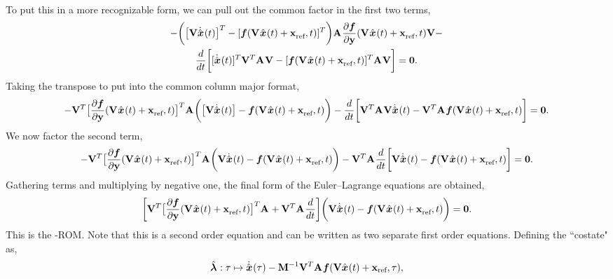 \documentclass[3p,computermodern,10pt]{elsarticle}
\begin{document}
\begin{appendices}
\begin{multline*}
\end{multline*}
To put this in a more recognizable form, we can pull out the common factor in the first two terms,
\begin{multline*}
- \bigg( \big[ \mathbf {V} \dot{\hat{ \boldsymbol x}}^{}(t) \big]^T  -  [\boldsymbol f(\mathbf {V}^{} \hat{ \boldsymbol x}^{}(t) + \mathbf{x}_\text{ref}^{},t)] ^T \bigg) \mathbf{A}^{}
 \frac{\partial \boldsymbol f}{\partial \mathbf{y}}(\mathbf {V}^{} \hat{ \boldsymbol x}^{}(t) + \mathbf{x}_\text{ref}^{},t) \mathbf {V} -  \\
\frac{d}{dt} \bigg[  [\dot{\hat{ \boldsymbol x}}^{}(t)]^T \mathbf {V}^T \mathbf{A}^{} \mathbf {V} -  
[\boldsymbol f(\mathbf {V}^{} \hat{ \boldsymbol x}^{}(t) + \mathbf{x}_\text{ref}^{},t) ]^T \mathbf{A}^{} \mathbf {V}  \bigg] = \boldsymbol 0.
\end{multline*}
Taking the transpose to put into the common column major format,
$$ -  \mathbf {V}^T \big[ \frac{\partial \boldsymbol f}{\partial \mathbf{y}}(\mathbf {V}^{} \hat{ \boldsymbol x}^{}(t) + \mathbf{x}_\text{ref}^{},t)  \big]^T \mathbf{A}^{} \bigg( \big[ \mathbf {V} \dot{\hat{ \boldsymbol x}}^{}(t)\big]  -  \boldsymbol f(\mathbf {V}^{} \hat{ \boldsymbol x}^{}(t) + \mathbf{x}_\text{ref}^{},t)  \bigg) -  \frac{d}{dt} \bigg[  \mathbf {V}^T \mathbf{A}^{} \mathbf {V} \dot{\hat{ \boldsymbol x}}^{}(t)  - \mathbf {V}^T \mathbf{A}^{} \boldsymbol f(\mathbf {V}^{} \hat{ \boldsymbol x}^{}(t) + \mathbf{x}_\text{ref}^{},t)   \bigg] = \boldsymbol 0.
 $$
We now factor the second term,
$$ -  \mathbf {V}^T \big[ \frac{\partial \boldsymbol f}{\partial \mathbf{y}}(\mathbf {V}^{} \hat{ \boldsymbol x}^{}(t) + \mathbf{x}_\text{ref}^{},t)  \big]^T \mathbf{A}^{ } \bigg(  \mathbf {V} \dot{\hat{ \boldsymbol x}}^{ }(t)  -  \boldsymbol f(\mathbf {V}^{} \hat{ \boldsymbol x}^{}(t) + \mathbf{x}_\text{ref}^{},t) \bigg) -  \mathbf {V}^T \mathbf{A}^{ } \frac{d}{dt} \bigg[   \mathbf {V} \dot{\hat{ \boldsymbol x}}^{}(t)  - \boldsymbol f(\mathbf {V}^{} \hat{ \boldsymbol x}^{}(t) + \mathbf{x}_\text{ref}^{},t) \bigg] = \boldsymbol 0. $$
Gathering terms and multiplying by negative one, the final form of the Euler--Lagrange equations are obtained,
\begin{equation}\label{eq:el_secondorder}
 \bigg[\mathbf {V}^T \big[\frac{\partial \boldsymbol f}{\partial \mathbf{y}}(\mathbf {V}^{} \hat{ \boldsymbol x}^{}(t) + \mathbf{x}_\text{ref}^{},t) \big]^T \mathbf{A}^{} + \mathbf {V}^T \mathbf{A}^{} \frac{d}{dt} \bigg] \bigg(  \mathbf {V} \dot{\hat{ \boldsymbol x}}^{}(t) -  \boldsymbol f(\mathbf {V}^{} \hat{ \boldsymbol x}^{}(t) + \mathbf{x}_\text{ref}^{},t) \bigg) = \boldsymbol 0.
\end{equation} 
This is the \methodAcronym-ROM. Note that this is a second order equation and can be written as two separate first order equations. Defining the ``costate" as,
\begin{equation*}
\hat{\boldsymbol \lambda}^{}  : \tau \mapsto \dot{\hat{ \boldsymbol x}}^{}(\tau)  -  \mathbf{M}^{-1} \mathbf {V}^T \mathbf{A}^{} \boldsymbol f(\mathbf {V} \hat{ \boldsymbol x}^{}(t) + \mathbf{x}_\text{ref}, \tau) ,
\end{equation*}

\end{appendices}
\end{document}
